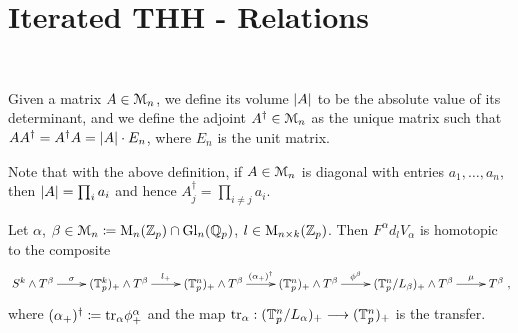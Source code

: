 \section{Iterated THH - Relations}
%
\\
\begin{defn}
Given a matrix $A \in \mathcal{M}_n$, we define its volume $\left\vert A\right\vert$ to be the absolute value of its determinant, and we define the adjoint $A^\dagger \in \mathcal{M}_n$ as the unique matrix such that $A A^\dagger = A^\dagger A = \left\vert A\right\vert \cdot E_n$, where $E_n$ is the unit matrix.
\end{defn}
%
%
\begin{rem}
Note that with the above definition, if $A \in \mathcal{M}_n$ is diagonal with entries $a_1, \ldots, a_n$, then $\left\vert A\right\vert = \prod_i a_i$ and hence $A^\dagger_j = \prod_{i \neq j} a_i$.
\end{rem}
%
%
\begin{lem}\cite[Lemma 3.17]{carlsson2011higher}
Let $\alpha$, $\beta \in \mathcal{M}_n \coloneqq \mathrm{M}_n(\mathbb{Z}_p) \cap \operatorname{Gl}_n(\mathbb{Q}_p)$, $l \in \mathrm{M}_{n \times k}(\mathbb{Z}_p)$. Then $F^\alpha d_l V_\alpha$ is homotopic to the composite
$$\begin{xy}
\xymatrix{
  S^k \wedge T^\beta \ar[r]^-{\sigma} &%
  (\sT^k_p)_+ \wedge T^\beta \ar[r]^-{l_+} &%
  (\sT^n_p)_+ \wedge T^\beta \ar[r]^-{(\alpha_+)^\dagger} &%
  (\sT^n_p)_+ \wedge T^\beta \ar[r]^-{\phi^\beta} &%
  (\sT^n_p/L_\beta)_+ \wedge T^\beta \ar[r]^-{\mu} &%
  T^\beta
  }%
\end{xy},$$
where $(\alpha_+)^\dagger \coloneqq \mathrm{tr}_\alpha\phi^\alpha_+$ and the map $\mathrm{tr}_\alpha: (\mathbb{T}^n_p/L_\alpha)_+ \longrightarrow (\mathbb{T}^n_p)_+$ is the transfer.
\end{lem}
%
%
